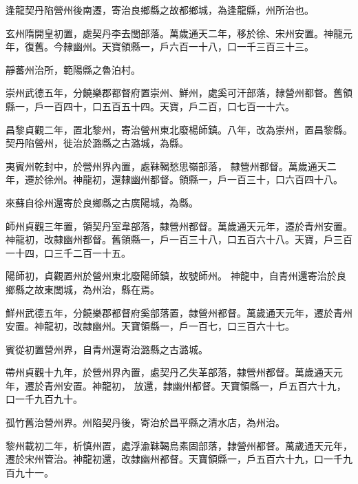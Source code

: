 \begin{pinyinscope}
 逢龍契丹陷營州後南遷，寄治良鄉縣之故都鄉城，為逢龍縣，州所治也。



 玄州隋開皇初置，處契丹李去閭部落。萬歲通天二年，移於徐、宋州安置。神龍元年，復舊。今隸幽州。天寶領縣一，戶六百一十八，口一千三百三十三。



 靜蕃州治所，範陽縣之魯泊村。



 崇州武德五年，分饒樂郡都督府置崇州、鮮州，處奚可汗部落，隸營州都督。舊領縣一，戶一百四十，口五百五十四。天寶，戶二百，口七百一十六。



 昌黎貞觀二年，置北黎州，寄治營州東北廢楊師鎮。八年，改為崇州，置昌黎縣。契丹陷營州，徙治於潞縣之古潞城，為縣。



 夷賓州乾封中，於營州界內置，處靺鞨愁思嶺部落，
 隸營州都督。萬歲通天二年，遷於徐州。神龍初，還隸幽州都督。領縣一，戶一百三十，口六百四十八。



 來蘇自徐州還寄於良鄉縣之古廣陽城，為縣。



 師州貞觀三年置，領契丹室韋部落，隸營州都督。萬歲通天元年，遷於青州安置。神龍初，改隸幽州都督。舊領縣一，戶一百三十八，口五百六十八。天寶，戶三百一十四，口三千二百一十五。



 陽師初，貞觀置州於營州東北廢陽師鎮，故號師州。
 神龍中，自青州還寄治於良鄉縣之故東閭城，為州治，縣在焉。



 鮮州武德五年，分饒樂郡都督府奚部落置，隸營州都督。萬歲通天元年，遷於青州安置。神龍初，改隸幽州。天寶領縣一，戶一百七，口三百六十七。



 賓從初置營州界，自青州還寄治潞縣之古潞城。



 帶州貞觀十九年，於營州界內置，處契丹乙失革部落，隸營州都督。萬歲通天元年，遷於青州安置。神龍初，
 放還，隸幽州都督。天寶領縣一，戶五百六十九，口一千九百九十。



 孤竹舊治營州界。州陷契丹後，寄治於昌平縣之清水店，為州治。



 黎州載初二年，析慎州置，處浮渝靺鞨烏素固部落，隸營州都督。萬歲通天元年，遷於宋州管治。神龍初還，改隸幽州都督。天寶領縣一，戶五百六十九，口一千九百九十一。




\end{pinyinscope}
